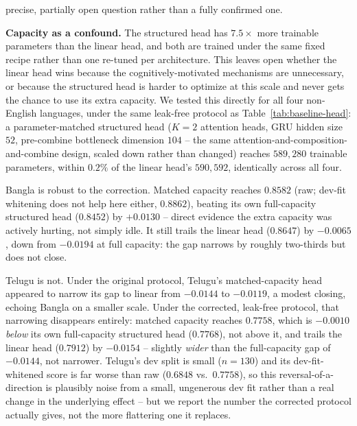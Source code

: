 \documentclass[manuscript]{acmart}
\begin{document}
precise, partially open question rather than a fully confirmed one.

\textbf{Capacity as a confound.} The structured head has $7.5\times$ more trainable parameters than the linear head, and both are trained under the same fixed recipe rather than one re-tuned per architecture. This leaves open whether the linear head wins because the cognitively-motivated mechanisms are unnecessary, or because the structured head is harder to optimize at this scale and never gets the chance to use its extra capacity. We tested this directly for all four non-English languages, under the same leak-free protocol as Table~\ref{tab:baseline-head}: a parameter-matched structured head ($K{=}2$ attention heads, GRU hidden size $52$, pre-combine bottleneck dimension $104$ -- the same attention-and-composition-and-combine design, scaled down rather than changed) reaches $589{,}280$ trainable parameters, within $0.2\%$ of the linear head's $590{,}592$, identically across all four.

Bangla is robust to the correction. Matched capacity reaches $0.8582$ (raw; dev-fit whitening does not help here either, $0.8862$), beating its own full-capacity structured head ($0.8452$) by $+0.0130$ -- direct evidence the extra capacity was actively hurting, not simply idle. It still trails the linear head ($0.8647$) by $-0.0065$, down from $-0.0194$ at full capacity: the gap narrows by roughly two-thirds but does not close.

Telugu is not. Under the original protocol, Telugu's matched-capacity head appeared to narrow its gap to linear from $-0.0144$ to $-0.0119$, a modest closing, echoing Bangla on a smaller scale. Under the corrected, leak-free protocol, that narrowing disappears entirely: matched capacity reaches $0.7758$, which is $-0.0010$ \emph{below} its own full-capacity structured head ($0.7768$), not above it, and trails the linear head ($0.7912$) by $-0.0154$ -- slightly \emph{wider} than the full-capacity gap of $-0.0144$, not narrower. Telugu's dev split is small ($n{=}130$) and its dev-fit-whitened score is far worse than raw ($0.6848$ vs.\ $0.7758$), so this reversal-of-a-direction is plausibly noise from a small, ungenerous dev fit rather than a real change in the underlying effect -- but we report the number the corrected protocol actually gives, not the more flattering one it replaces.
\end{document}
